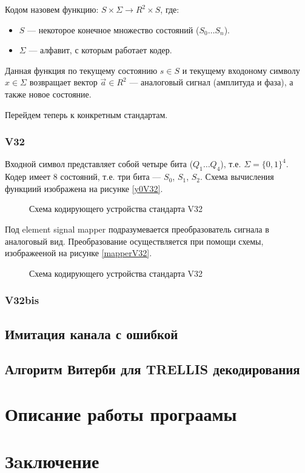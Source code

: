 \documentclass[a4paper,12pt]{article}
\begin{document}
Кодом назовем функцию: $S \times \Sigma \rightarrow R^2 \times S$, где:
\begin{itemize}
	\item $S$ --- некоторое конечное множество состояний ($S_0 \ldots S_n$).
	\item $\Sigma$ --- алфавит, с которым работает кодер.
\end{itemize}
Данная функция по текущему состоянию $s \in S$ и текущему входоному символу $x \in \Sigma$ возвращает вектор
$\vec{a} \in R^2$ --- аналоговый сигнал (амплитуда и фаза), а также новое состояние.

Перейдем теперь к конкретным стандартам.

\subsubsection{V32}
Входной символ представляет собой четыре бита ($Q_1 \ldots Q_4$), т.е. $\Sigma = \{0, 1\}^4$. Кодер имеет $8$
состояний, т.е. три бита --- $S_0$, $S_1$, $S_2$. Схема вычисления функциий изображена на рисунке \ref{y0V32}.

\begin{figure}
	\caption{Схема кодирующего устройства стандарта V32}
	\label{schemeV32}
\end{figure}

Под element signal mapper подразумевается преобразователь сигнала в аналоговый вид. Преобразование осуществляется
при помощи схемы, изображееной на рисунке \ref{mapperV32}.

\begin{figure}
	\caption{Схема кодирующего устройства стандарта V32}
	\label{schemeV32}
\end{figure}

\subsubsection{V32bis}

\subsection{Имитация канала с ошибкой}

\subsection{Алгоритм Витерби для TRELLIS декодирования}

\section{Описание работы програамы}

\section{Зaключение}


\end{document}
